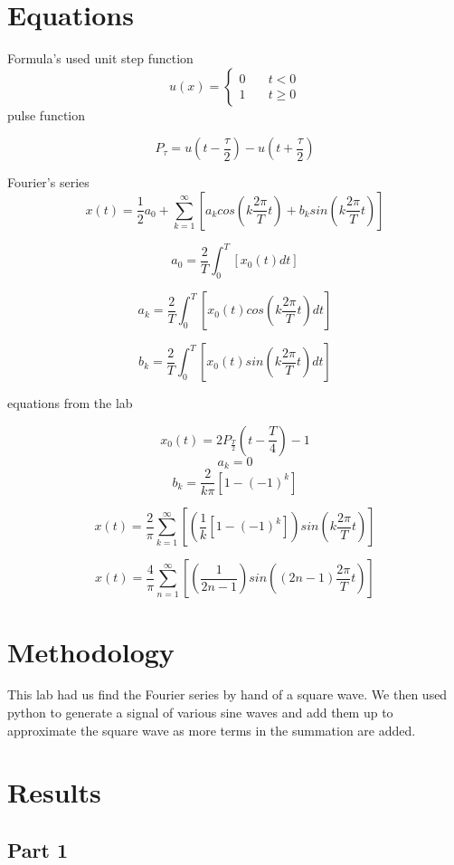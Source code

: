 \documentclass[12pt,a4paper]{article}
\begin{document}
\section{Equations}\label{sec:lit-rev}
Formula's used
unit step function
\[
u(x) = \left\{
        \begin{array}{ll}
            0 & \quad t < 0 \\
            1 & \quad t \geq 0
        \end{array}
    \right.
\]
pulse function

\[P_{\tau} = u \left (t-\frac \tau 2 \right)-u \left (t+\frac \tau 2 \right)\]

Fourier's series
\[x(t) = \frac 1  2 a_0 + \sum_{k=1}^\infty \left[ a_k cos \left (k \frac {2\pi}  T t \right) + b_k sin \left(k \frac {2\pi}  T t \right) \right]\]

\[a_0 = \frac 2 T \int_0^T \left [ x_0(t) dt \right ]\]

\[a_k = \frac 2 T \int_0^T \left [ x_0(t) cos \left (k \frac {2 \pi} T t \right )dt \right ]\]

\[b_k = \frac 2 T \int_0^T \left [ x_0(t) sin \left (k \frac {2 \pi} T t \right )dt \right ]\]


equations from the lab

\[x_0(t) = 2 P_{\frac T 2} \left (t-\frac T 4 \right)- 1\]
\[a_k =  0\]
\[b_k =   \frac 2  {k \pi}   \left [ 1-(-1)^k \right ] \]


\[x(t) = \frac 2  { \pi }  \sum _{k=1}^\infty \left[ \left (\frac 1  {k}   \left [1- (-1)^k \right ] \right) sin \left(k \frac {2 \pi}  {T} t \right) \right]\]

\[x(t) = \frac 4  { \pi }  \sum_{n=1}^\infty \left[ \left(\frac 1  {2n-1}    \right) sin \left((2n-1) \frac {2 \pi} {T} t \right) \right]\]


\section{Methodology}\label{sec:meth}
This lab had us find the Fourier series by hand of a square wave.  We then used python to generate a signal of various sine waves and add them up to approximate the square wave as more terms in the summation are added.

\section{Results}\label{sec:res}
\subsection*{Part 1}
\end{document}

